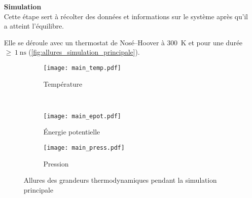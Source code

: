 \textbf{Simulation}\\
Cette étape sert à récolter des données et informations sur le système après qu'il a atteint l'équilibre.

Elle se déroule avec un thermostat de Nosé--Hoover à \qty{300}{\kelvin} et pour une durée $\geq~\qty{1}{\nano \second}$ (\autoref{fig:allures_simulation_principale}).

\begin{figure}[h]
    \centering
    \begin{subfigure}[t]{.49\textwidth}
        \texttt{[image: main\_temp.pdf]}
        \caption{Température}
    \end{subfigure}%
    ~
    \begin{subfigure}[t]{.49\textwidth}
        \texttt{[image: main\_epot.pdf]}
        \caption{Énergie potentielle}
    \end{subfigure}
    \begin{subfigure}[t]{.49\textwidth}
        \texttt{[image: main\_press.pdf]}
        \caption{Pression}
    \end{subfigure}
    \caption{Allures des grandeurs thermodynamiques pendant la simulation principale}
    \label{fig:allures_simulation_principale}
\end{figure}
